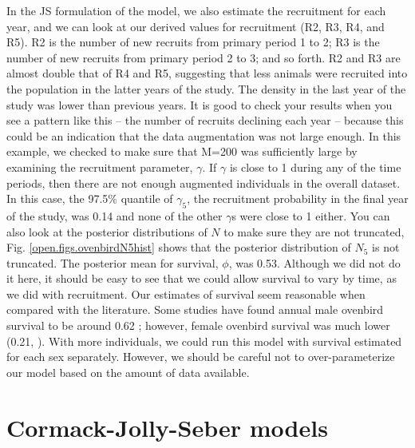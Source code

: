In the JS formulation of the model, we also estimate the recruitment for each year,
and we can look at our derived values for recruitment (R2, R3, R4, and R5).
R2 is the number of new
recruits from primary period 1 to 2; R3 is the number of new recruits from primary period 2 to 3; and so forth.
R2 and R3 are almost
double that of R4 and R5, suggesting that less animals were recruited into the population in the latter years
of the study.  The density in
the last year of the study was lower than previous years.
It is good to check your results when you see a pattern like this -- the number
of recruits declining each year -- because this could be an indication that the data augmentation was not large enough.
In this example,
we checked to make sure that M=200 was sufficiently large by examining the recruitment parameter,
$\gamma$.  If $\gamma$ is close to 1 during any of the time periods, then there are not enough
augmented individuals in the overall dataset.  In this case, the 97.5\% quantile of $\gamma_5$,
the recruitment probability in the final year of the study, was 0.14 and none of the other $\gamma$s
 were close to 1 either.  You can also look at the posterior distributions of $N$ to make sure
they are not truncated, Fig. \ref{open.figs.ovenbirdN5hist} shows that the posterior distribution of $N_5$ is not
truncated. The posterior mean for survival, $\phi$, was 0.53.  Although we did not do it here,
it should be easy to see that we could allow survival to vary by time, as we did with recruitment.
Our estimates of survival seem
reasonable when compared with the literature.  Some studies have found annual male ovenbird
survival to be around 0.62 \citep{porneluzi_faaborg:1999, bayne_hobson:2002}; however,
female ovenbird
survival was much lower (0.21,
\cite{bayne_hobson:2002}). With more individuals, we could run this model with survival
estimated for each sex separately.
However, we should be careful not to over-parameterize our model based on the amount of
data available.



\section{Cormack-Jolly-Seber models}

